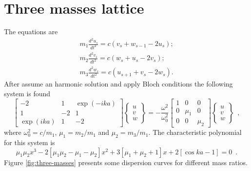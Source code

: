 \documentclass[12pt,letterpaper]{article}
\begin{document}
\section{Three masses lattice}
The equations are
\begin{subequations}
\begin{align}
m_1\frac{d^2 u_s}{dt^2} = c(v_s+w_{s-1}-2u_s); \\
m_2\frac{d^2 v_s}{dt^2} = c(w_{s}+u_{s}-2v_s);\\
m_3\frac{d^2 w_s}{dt^2} =c(u_{s+1}+v_{s}-2w_s).
\end{align}
\label{eq:three-masses}
\end{subequations}
After assume an harmonic solution and apply Bloch conditions the following system is found
 \begin{equation}
\left[ \begin{array}{ccc}
-2 & 1 & \exp(-ika) \\ 
1 & -2 & 1 \\ 
\exp(ika) & 1 & -2
\end{array}  \right] \left\lbrace \begin{array}{c}
u \\ 
v \\ 
w
\end{array}  \right\rbrace = -\frac{\omega^2}{\omega_0^2}\left[ \begin{array}{ccc}
1 & 0 & 0 \\ 
0 & \mu_1 & 0 \\ 
0 & 0 & \mu_2
\end{array} \right] \left\lbrace \begin{array}{c}
u \\ 
v \\ 
w
\end{array} \right\rbrace \enspace , 
 \end{equation}
where $\omega_0^2=c/m_1$, $\mu_1 = m_2/m_1$ and $\mu_2=m_3/m_1$. The characteristic polynomial for this system is
\begin{equation}
\mu_1 \mu_2 x^3 - 2[\mu_1\mu_2 -\mu_1 -\mu_2]x^2 + 3[\mu_1+\mu_2+1]x+2[\cos ka -1] = 0 \enspace .
\end{equation}
Figure \ref{fig:three-masses} presents some dispersion curves for different mass ratios.
\end{document}
